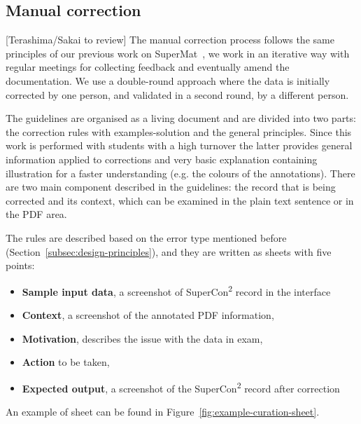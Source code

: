 \documentclass[a4paper]{article}
\begin{document}
\subsection{Manual correction}
[Terashima/Sakai to review]  
The manual correction process follows the same principles of our previous work on SuperMat~\cite{foppiano2021supermat}, we work in an iterative way with regular meetings for collecting feedback and eventually amend the documentation. 
We use a double-round approach where the data is initially corrected by one person, and validated in a second round, by a different person. 

The guidelines are organised as a living document and are divided into two parts: the correction rules with examples-solution and the general principles.
Since this work is performed with students with a high turnover the latter provides general information applied to corrections and very basic explanation containing illustration for a faster understanding (e.g. the colours of the annotations). 
There are two main component described in the guidelines: the record that is being corrected and its context, which can be examined in the plain text sentence or in the PDF area. 

The rules are described based on the error type mentioned before (Section~\ref{subsec:design-principles}), and they are written as sheets with five points:
\begin{itemize}
    \item \textbf{Sample input data}, a screenshot of SuperCon\textsuperscript{2} record in the interface
    \item \textbf{Context}, a screenshot of the annotated PDF information,
    \item \textbf{Motivation}, describes the issue with the data in exam, 
    \item \textbf{Action} to be taken, 
    \item \textbf{Expected output}, a screenshot of the SuperCon\textsuperscript{2} record after correction
\end{itemize}

An example of sheet can be found in Figure~\ref{fig:example-curation-sheet}. 
\end{document}
